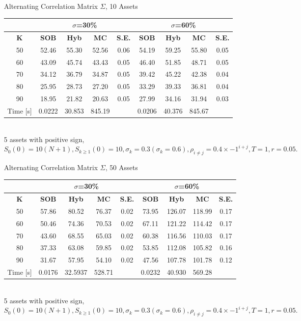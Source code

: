 \documentclass[a4paper]{article}
\begin{document}
\begin {table}
\caption {Alternating Correlation Matrix $\Sigma$, 10 Assets} 
\begin{center}
\begin{tabular}{c|c c c c|c c c c}
\hline
\multicolumn{1}{c|}{} & \multicolumn{4}{|c|}{$\sigma$=30\%} & \multicolumn{4}{|c}{$\sigma$=60\%} \\ 
\hline
  \textbf{K} & \textbf{SOB} & \textbf{Hyb} & \textbf{MC} & \textbf{S.E.} & \textbf{SOB} & \textbf{Hyb} & \textbf{MC} & \textbf{S.E.} \\
50 &	52.46&55.30	&52.56  &0.06  &54.19  &59.25&55.80&0.05  \\
60 & 	43.09&45.74 	&43.43  &0.05  &46.40  &51.85&48.71&0.05  \\
70 & 	34.12&36.79 	&34.87  &0.05  &39.42  &45.22&42.38&0.04  \\
80 & 	25.95&28.73 	&27.20  &0.05  &33.29  &39.33&36.81&0.04  \\
90 &  18.95&21.82 	&20.63  &0.05  &27.99  &34.16&31.94&0.03  \\
\hline
Time [s] & 0.0222&30.853 &845.19 & &0.0206  &40.376& 845.67& \\
\hline
\end{tabular}
\\[8pt]
\caption*{5 assets with positive sign, $S_0(0)=10(N+1), S_{k\geq1}(0) = 10, \sigma_k = 0.3 (\sigma_k = 0.6), \rho_{i\neq j} = 0.4\times-1^{i+j}, T = 1, r=0.05.$}
\end{center}
\end{table}

\begin {table}
\caption {Alternating Correlation Matrix $\Sigma$, 50 Assets} 
\begin{center}
\begin{tabular}{c|c c c c|c c c c}
\hline
\multicolumn{1}{c|}{} & \multicolumn{4}{|c|}{$\sigma$=30\%} & \multicolumn{4}{|c}{$\sigma$=60\%} \\ 
\hline
  \textbf{K} & \textbf{SOB} & \textbf{Hyb}	& \textbf{MC} & \textbf{S.E.} & \textbf{SOB} & \textbf{Hyb} & \textbf{MC} & \textbf{S.E.}\\
50 &	57.86&80.52 	& 76.37  & 0.02 & 73.95  &126.07 &118.99 &0.17 \\
60 & 	50.46& 74.36& 70.53 & 0.02&67.11 &121.22 & 114.42&0.17 \\
70 & 43.60& 68.55& 65.03& 0.02& 60.38&116.56&110.03&0.17\\
80 & 	37.33& 63.08& 59.85& 0.02&53.85&112.08&105.82&0.16 \\
90 & 31.67& 57.95& 54.10& 0.02&47.56&107.78&101.78&0.12\\
\hline
Time [s] & 0.0176 &32.5937 & 528.71 & &0.0232 &40.930 & 569.28 & \\
\hline
\end{tabular}
\\[8pt]
\caption*{5 assets with positive sign, $S_0(0)=10(N+1), S_{k\geq1}(0) = 10, \sigma_k = 0.3 (\sigma_k = 0.6), \rho_{i\neq j} = 0.4\times-1^{i+j}, T = 1, r=0.05.$}
\end{center}
\end{table}
\end{document}
